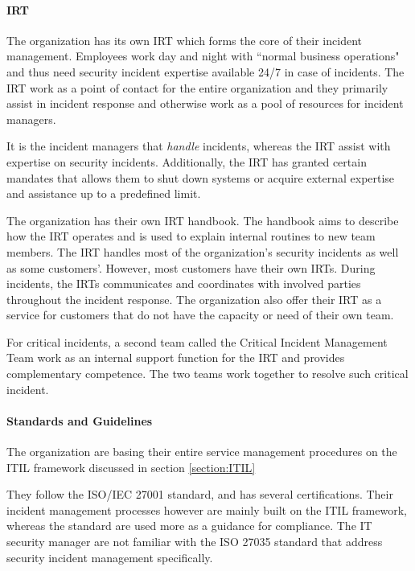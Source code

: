 \paragraph{\acl{IRT}}
The organization has its own \ac{IRT} which forms the core of their incident management. Employees work day and night with ``normal business operations" and thus need security incident expertise available 24/7 in case of incidents. The \ac{IRT} work as a point of contact for the entire organization and they primarily assist in incident response and otherwise work as a pool of resources for incident managers. 

It is the incident managers that \emph{handle} incidents, whereas the \ac{IRT} assist with expertise on security incidents. Additionally, the \ac{IRT} has granted certain mandates that allows them to shut down systems or acquire external expertise and assistance up to a predefined limit.    

The organization has their own \ac{IRT} handbook. The handbook aims to describe how the \ac{IRT} operates and is used to explain internal routines to new team members. The \ac{IRT} handles most of the organization's security incidents as well as some customers'. However, most customers have their own \acp{IRT}. During incidents, the \acp{IRT} communicates and coordinates with involved parties throughout the incident response. The organization also offer their \ac{IRT} as a service for customers that do not have the capacity or need of their own team.

For critical incidents, a second team called the Critical Incident Management Team work as an internal support function for the \ac{IRT} and provides complementary competence. The two teams work together to resolve such critical incident. 

\paragraph{Standards and Guidelines}
The organization are basing their entire service management procedures on the ITIL framework discussed in section \ref{section:ITIL} 

They follow the ISO/IEC 27001 standard, and has several certifications. Their incident management processes however are mainly built on the ITIL framework, whereas the standard are used more as a guidance for compliance. The IT security manager are not familiar with the ISO 27035 standard that address security incident management specifically. 

